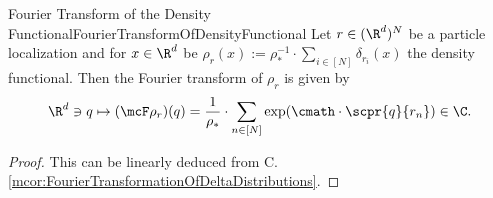 \begin{mcor}{Fourier Transform of the Density Functional}{FourierTransformOfDensityFunctional}
    Let $r\in (\R^d)^N$ be a particle localization and for $x\in\R^d$ be $\rho_{r}(x) := \rho_*^{-1}\cdot\sum_{i\in[N]}\delta_{r_i}(x)$ the density functional. Then the Fourier transform of $\rho_{r}$ is given by
    \[
        \R^d\ni q\mapsto (\mcF\rho_{r})(q) = \frac{1}{\rho_*}\cdot\sum_{n\in[N]}\exp(\cmath\cdot \scpr{q}{r_n})\in\C.
    \]
\end{mcor}
\begin{proof}
    This can be linearly deduced from C.\ref{mcor:FourierTransformationOfDeltaDistributions}. 
\end{proof}